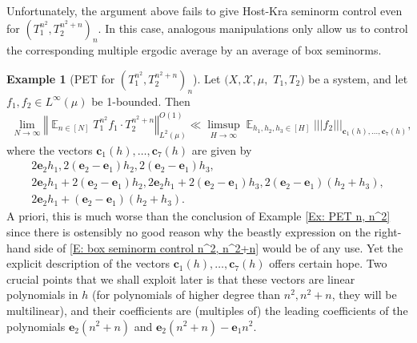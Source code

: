 \documentclass[11pt]{amsart}
\theoremstyle{definition}
\newtheorem{example}[lemma]{Example}
\DeclareMathOperator*{\E}{\mathbb{E}}
\newcommand{\CX}{{\mathcal X}}
\newcommand{\bc}{{\mathbf{c}}}
\newcommand{\be}{{\mathbf{e}}}
\newcommand{\norm}[1]{\left\Vert #1\right\Vert}
\newcommand{\nnorm}[1]{\lvert\!|\!| #1|\!|\!\rvert}
\newcommand{\1}{{\mathbf{1}}}
\begin{document}
Unfortunately, the argument above fails to give Host-Kra seminorm control even for $(T_1^{n^2}, T_2^{n^2+n})_n$. In this case, analogous manipulations only allow us to control the corresponding multiple ergodic average by an average of box seminorms.
\begin{example}[PET for $(T_1^{n^2}, T_2^{n^2+n})_n$]\label{Ex: PET n^2, n^2+n}
    Let $(X, \CX, \mu,$\! $T_1, T_2)$ be a system, and let $f_1, f_2\in L^\infty(\mu)$ be 1-bounded. Then 
    \begin{align}\label{E: box seminorm control n^2, n^2+n}
        \lim_{N\to\infty}\norm{\E_{n\in[N]}T_1^{n^2}f_1\cdot T_2^{n^2+n}}_{L^2(\mu)}^{O(1)}\ll \limsup_{H\to\infty}\E_{h_1,h_2,h_3\in[H]}\nnorm{f_2}_{\bc_1(h), \ldots, \bc_7(h)},
    \end{align}
    where the vectors $\bc_1(h), \ldots, \bc_7(h)$ are given by
    \begin{gather*}
        2\be_2 h_1, 2(\be_2-\be_1)h_2, 2(\be_2-\be_1)h_3,\\
        2\be_2h_1 + 2(\be_2-\be_1)h_2, 2 \be_2 h_1 + 2(\be_2-\be_1)h_3, 2(\be_2-\be_1)(h_2+h_3),\\
        2\be_2h_1 + (\be_2-\be_1)(h_2+h_3).
    \end{gather*}
    A priori, this is much worse than the conclusion of Example \ref{Ex: PET n, n^2} since there is ostensibly no good reason why the beastly expression on the right-hand side of \eqref{E: box seminorm control n^2, n^2+n} would be of any use. Yet the explicit description of the vectors $\bc_1(h), \ldots, \bc_7(h)$ offers certain hope.
    Two crucial points that we shall exploit later is that these vectors are linear polynomials in $h$ (for polynomials of higher degree than $n^2, n^2 + n$, they will be multilinear), and their coefficients are (multiples of) the leading coefficients of the polynomials $\be_2 (n^2+n)$ and $\be_2 (n^2 + n) - \be_1 n^2$.
\end{example}
\end{document}
